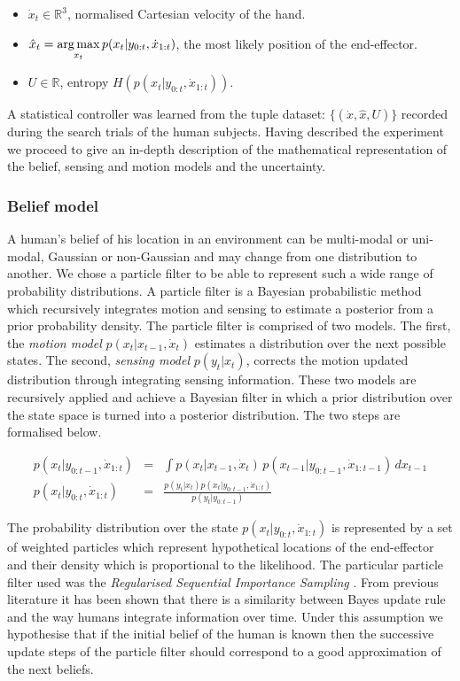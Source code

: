 \begin{itemize}
 \item $\dot{x}_t \in \mathbb{R}^{3}$, normalised Cartesian velocity of the hand.
 \item $\hat{x}_t = \operatorname*{arg\,max}\limits_{x_t} p(x_{t}|y_{0:t},\dot{x}_{1:t})$, the most likely position of the
end-effector.
 \item $U \in \mathbb{R}$, entropy $H\left(p(x_{t}|y_{0:t},\dot{x}_{1:t})\right)$.
\end{itemize}
A statistical controller was learned from the tuple dataset: $\{(\dot{x},\hat{x},U)\}$ recorded during the search 
trials of the human subjects. Having described the experiment we proceed to give an in-depth description 
of the mathematical representation of the belief, sensing and motion models and the uncertainty. 


\subsubsection{Belief model}


A human's belief of his location in an environment can be multi-modal or uni-modal, Gaussian or non-Gaussian and may change from one distribution to another. 
We chose a particle filter to be able to represent such a wide range of probability distributions. A particle filter is a Bayesian probabilistic method 
which recursively integrates motion and sensing to estimate a posterior from a prior probability density. The particle filter is comprised of two models.
The first, the \textit{motion model} $p(x_{t}|x_{t-1},\dot{x}_{t})$ estimates a distribution over the next possible states. The second, \textit{sensing model} 
$p(y_{t}|x_{t})$, corrects the motion updated distribution through integrating sensing information. These two models are recursively applied and achieve a Bayesian filter in which a prior distribution 
over the state space is turned into a posterior distribution. The two steps are formalised below.

\begin{eqnarray}
 p(x_{t}|y_{0:t-1},\dot{x}_{1:t}) &=& \int p(x_{t}|x_{t-1},\dot{x}_{t})\,p(x_{t-1}|y_{0:t-1},\dot{x}_{1:t-1})\,dx_{t-1} \\
 p(x_{t}|y_{0:t},\dot{x}_{1:t}) &=& \frac{p(y_{t}|x_{t})p(x_{t}|y_{0:t-1},\dot{x}_{1:t})}{p(y_{t}|y_{0:t-1})}
\end{eqnarray}

The probability distribution over the state $p(x_{t}|y_{0:t},\dot{x}_{1:t})$ is represented by a set of weighted particles which represent hypothetical
locations of the end-effector and  their density which is proportional to the likelihood. The particular particle filter used was the 
\textit{Regularised Sequential Importance Sampling} \cite[p.182]{Arul_Mask_Clap_2002}. From previous literature \cite{Bake_Saxe_Tene_2011} 
it has been shown that there is a similarity between Bayes update rule and the way humans integrate information over time. Under this assumption 
we hypothesise that if the initial belief of the human is known then the successive update steps of the particle filter should correspond to a good approximation 
of the next beliefs. 

